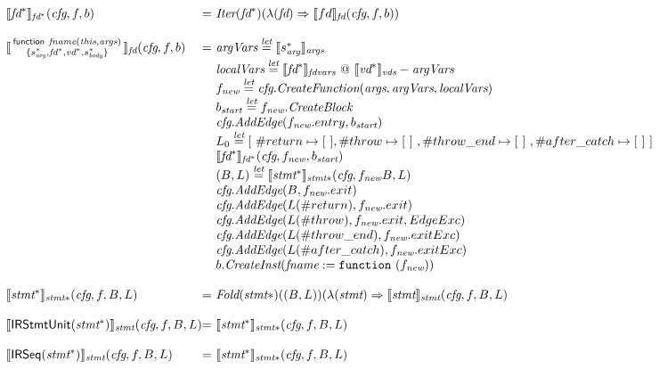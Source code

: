 \[\begin{array}{l@{}l@{~}l}
\transfun{\emph{fd}^*}_{\emph{fd}^*}(\emph{cfg}, f, b) & = &
\Iter(\emph{fd}^*)(\lambda(\emph{fd}) \Rightarrow \transfun{fd}_{\emph{fd}}(\emph{cfg}, f, b))\\
& & \\

\transfun{\irfundeclsmall{\emph{fname}}{\emph{this}}{\emph{args}}{s_{\emph{arg}}^*}{\emph{fd}^*}{\emph{vd}^*}{s_{\emph{body}}^*}}_{\emph{fd}}(\emph{cfg}, f, b) & = &
\emph{argVars} \letval \transfun{s_{\emph{arg}}^*}_{\emph{args}} \\
& & \emph{localVars} \letval \transfun{\emph{fd}^*}_{\emph{fdvars}} ~@~ \transfun{\emph{vd}^*}_{\emph{vds}} - \emph{argVars} \\
& & f_{\emph{new}} \letval \emph{cfg}.\emph{CreateFunction}(\emph{args}, \emph{argVars}, \emph{localVars})\\
& & b_{\emph{start}} \letval f_{\emph{new}}.\emph{CreateBlock}\\
& & \emph{cfg}.\emph{AddEdge}(f_{\emph{new}}.entry, b_{\emph{start}})\\
& & L_0 \letval [\ \#return \mapsto [\ ], \#throw \mapsto [\ ]\ , \#throw\_end \mapsto [\ ]\  , \#after\_catch \mapsto [\ ]\ ] \\
& & \transfun{\emph{fd}^*}_{\emph{fd}^*}(\emph{cfg}, f_{\emph{new}}, b_{\emph{start}})\\
& & (B, L) \letval \transfun{\emph{stmt}^*}_{\emph{stmt}*}(\emph{cfg}, f_{\emph{new}}B, L)\\
& & \emph{cfg}.\emph{AddEdge}(B, f_{\emph{new}}.exit)\\
& & \emph{cfg}.\emph{AddEdge}(L(\#return), f_{\emph{new}}.exit)\\
& & \emph{cfg}.\emph{AddEdge}(L(\#throw), f_{\emph{new}}.exit, EdgeExc)\\
& & \emph{cfg}.\emph{AddEdge}(L(\#throw\_end), f_{\emph{new}}.exitExc)\\
& & \emph{cfg}.\emph{AddEdge}(L(\#after\_catch), f_{\emph{new}}.exitExc)\\
& & b.\emph{CreateInst}(\emph{fname} := \TT{function}\ (f_{\emph{new}}))\\
& & \\

\transfun{\emph{stmt}^*}_{\emph{stmt}*}(\emph{cfg}, f, B, L) & = &
\Fold(\emph{stmt}*)((B, L))(\lambda(\emph{stmt}) \Rightarrow \transfun{\emph{stmt}}_{\emph{stmt}}(\emph{cfg}, f, B, L)\\
& & \\


\transfun{\irstmtunit{\emph{stmt}^*}}_{\emph{stmt}}(\emph{cfg}, f, B, L) & = &
\transfun{\emph{stmt}^*}_{\emph{stmt}*}(\emph{cfg}, f, B, L)\\
& & \\

\transfun{\irseq{\emph{stmt}^*}}_{\emph{stmt}}(\emph{cfg}, f, B, L) & = &
\transfun{\emph{stmt}^*}_{\emph{stmt}*}(\emph{cfg}, f, B, L)\\
\end{array}
\]

